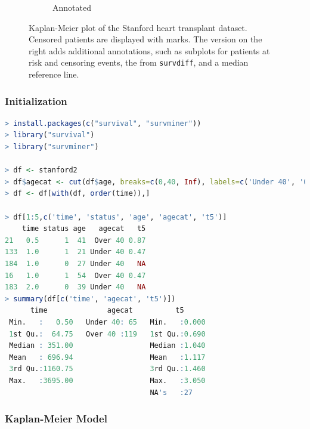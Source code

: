 \begin{figure}[H]
\begin{subfigure}[c]{0.48\textwidth}
  \caption{Annotated}
  \label{fig:stanford_km:annotated}
  \end{subfigure}
\caption{
Kaplan-Meier plot of the Stanford heart transplant dataset. Censored patients are displayed with marks.
The version on the right adds additional annotations, such as
subplots for patients at risk and censoring events,
the \pvalue from \texttt{survdiff}, and a median reference line.
}
\label{fig:stanford_km}
\end{figure}

\subsubsection{Initialization}
\label{additional:Survival:Rcode:init}

\begin{lstlisting}[language=R]
> install.packages(c("survival", "survminer"))
> library("survival")
> library("survminer")

> df <- stanford2
> df$agecat <- cut(df$age, breaks=c(0,40, Inf), labels=c('Under 40', 'Over 40'), right=FALSE)
> df <- df[with(df, order(time)),]

> df[1:5,c('time', 'status', 'age', 'agecat', 't5')]
    time status age   agecat   t5
21   0.5      1  41  Over 40 0.87
133  1.0      1  21 Under 40 0.47
184  1.0      0  27 Under 40   NA
16   1.0      1  54  Over 40 0.47
183  2.0      0  39 Under 40   NA
> summary(df[c('time', 'agecat', 't5')])
      time              agecat          t5
 Min.   :   0.50   Under 40: 65   Min.   :0.000
 1st Qu.:  64.75   Over 40 :119   1st Qu.:0.690
 Median : 351.00                  Median :1.040
 Mean   : 696.94                  Mean   :1.117
 3rd Qu.:1160.75                  3rd Qu.:1.460
 Max.   :3695.00                  Max.   :3.050
                                  NA's   :27
\end{lstlisting}

\subsubsection{Kaplan-Meier Model}
\label{additional:Survival:Rcode:km}

